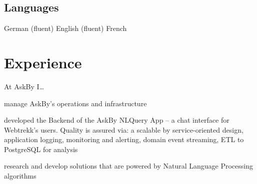 \documentclass[]{deedy-resume-openfont}
\begin{document}
\begin{minipage}[t]{0.33\textwidth}
\sectionsep
\subsection{Languages}
German (fluent) \textbullet{}
English (fluent) \textbullet{}
French



%
%

\end{minipage} 
\hfill
\begin{minipage}[t]{0.62\textwidth} 


\section{Experience}

\vspace{10pt} %

At AskBy I\ldots
\vspace{9pt} %
\begin{tightemize}
\item manage AskBy's operations and infrastructure
\item developed the Backend of the AskBy NLQuery App -- a chat interface for Webtrekk's users.
    Quality is assured via: a scalable by service-oriented design, application logging, monitoring and alerting, domain event streaming, ETL to PostgreSQL for analysis
\item research and develop solutions that are powered by Natural Language Processing algorithms
\end{tightemize}
\sectionsep


\end{minipage}
\end{document}
